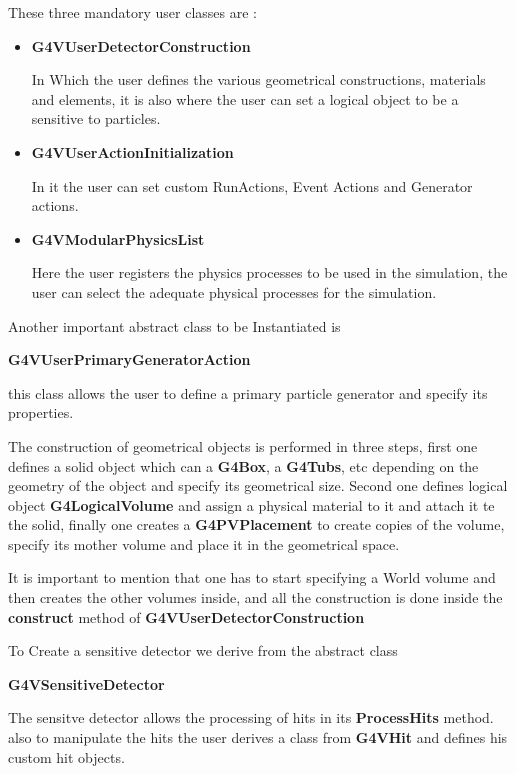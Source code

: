 \documentclass[11pt,a4paper]{report}
\begin{document}
	These three mandatory user classes are :
	\begin{itemize}
		\item \textbf{\color{blue} G4VUserDetectorConstruction}

		In Which the user defines the various geometrical constructions, materials and elements, it is also where the user can set a logical object to be a sensitive to particles.
		\item \textbf{\color{blue} G4VUserActionInitialization}

		In it the user can set custom RunActions, Event Actions and Generator actions.
		\item \textbf{\color{blue} G4VModularPhysicsList}

		Here the user registers the physics processes to be used in the simulation, the user can select the adequate physical processes for the simulation.
	\end{itemize}

	Another important abstract class to be Instantiated is
	\begin{flushleft}
		\textbf{\color{blue} G4VUserPrimaryGeneratorAction}
	\end{flushleft}
	this class allows the user to define a primary particle generator and specify its properties.

	The construction of geometrical objects is performed in three steps, first one defines a solid object which can a \textbf{G4Box}, a \textbf{G4Tubs}, etc depending on the geometry of the object and specify its geometrical size. Second one defines logical object \textbf{G4LogicalVolume} and assign a physical material to it and attach it te the solid, finally one creates  a \textbf{G4PVPlacement} to create copies of the volume, specify its mother volume and place it in the geometrical space.

	It is important to mention that one has to start specifying a World volume and then creates the other volumes inside, and all the construction is done inside the \textbf{construct} method of \textbf{\color{blue} G4VUserDetectorConstruction}

	To Create a sensitive detector we derive from the abstract class
	\begin{flushleft}
		\textbf{\color{blue} G4VSensitiveDetector}
	\end{flushleft}
	The sensitve detector allows the processing of hits in its \textbf{ProcessHits} method. also to manipulate the hits the user derives a class from \textbf{G4VHit} and defines his custom hit objects.
\end{document}
